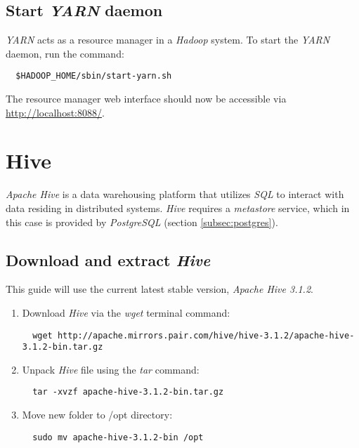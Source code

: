 \documentclass{article}
\begin{document}
  \subsection{Start \emph{YARN} daemon}
  \emph{YARN} acts as a resource manager in a \emph{Hadoop} system. To start the \emph{YARN}
  daemon, run the command:
  \begin{verbatim}
  $HADOOP_HOME/sbin/start-yarn.sh
  \end{verbatim}
  The resource manager web interface should now be accessible via
  \url{http://localhost:8088/}.

\newpage
\section{Hive}
\emph{Apache Hive} is a data warehousing platform that utilizes \emph{SQL} to interact with
data residing in distributed systems. \emph{Hive} requires a \emph{metastore} service, which in this
case is provided by \emph{PostgreSQL} (section \ref{subsec:postgres}).

  \subsection{Download and extract \emph{Hive}}
  This guide will use the current latest stable version, \emph{Apache Hive 3.1.2}.
  \begin{enumerate}
  \item Download \emph{Hive} via the \emph{wget} terminal command:
  \begin{verbatim}
  wget http://apache.mirrors.pair.com/hive/hive-3.1.2/apache-hive-3.1.2-bin.tar.gz
  \end{verbatim}

  \item Unpack \emph{Hive} file using the \emph{tar} command:
  \begin{verbatim}
  tar -xvzf apache-hive-3.1.2-bin.tar.gz
  \end{verbatim}

  \item Move new folder to /opt directory:
  \begin{verbatim}
  sudo mv apache-hive-3.1.2-bin /opt
  \end{verbatim}
  \end{enumerate}
\end{document}
